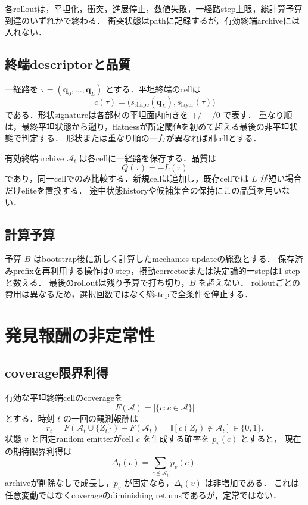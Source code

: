 \documentclass[a4paper,11pt]{ltjsarticle}
\newcommand{\ind}{\mathbb{I}}
\newcommand{\outarchive}{\mathcal A}
\begin{document}
各rolloutは，平坦化，衝突，進展停止，数値失敗，一経路step上限，総計算予算到達のいずれかで終わる．
衝突状態はpathに記録するが，有効終端archiveには入れない．

\subsection{終端descriptorと品質}

一経路を \(\tau=(\bm q_0,\ldots,\bm q_L)\) とする．平坦終端のcellは
\begin{equation}
  c(\tau)=
  \bigl(s_{\mathrm{shape}}(\bm q_L),
        s_{\mathrm{layer}}(\tau)\bigr)
  \label{eq:terminal-cell}
\end{equation}
である．形状signatureは各部材の平坦面内向きを \(+/-/0\) で表す．
重なり順は，最終平坦状態から遡り，flatnessが所定閾値を初めて超える最後の非平坦状態で判定する．
形状または重なり順の一方が異なれば別cellとする．

有効終端archive \(\outarchive_t\) は各cellに一経路を保存する．品質は
\begin{equation}
  Q(\tau)=-L(\tau)
\end{equation}
であり，同一cellでのみ比較する．新規cellは追加し，既存cellでは \(L\) が短い場合だけeliteを置換する．
途中状態historyや候補集合の保持にこの品質を用いない．

\subsection{計算予算}

予算 \(B\) はbootstrap後に新しく計算したmechanics updateの総数とする．
保存済みprefixを再利用する操作は0 step，摂動correctorまたは決定論的一stepは1 stepと数える．
最後のrolloutは残り予算で打ち切り，\(B\) を超えない．
rolloutごとの費用は異なるため，選択回数ではなく総stepで全条件を停止する．

\section{発見報酬の非定常性}
\label{sec:nonstationarity}

\subsection{coverage限界利得}

有効な平坦終端cellのcoverageを
\begin{equation}
  F(\outarchive)=|\{c:c\in\outarchive\}|
\end{equation}
とする．時刻 \(t\) の一回の観測報酬は
\begin{equation}
  r_t=
  F(\outarchive_t\cup\{Z_t\})-F(\outarchive_t)
  =\ind[c(Z_t)\notin\outarchive_t]
  \in\{0,1\}.
  \label{eq:binary-reward}
\end{equation}
状態 \(v\) と固定random emitterがcell \(c\) を生成する確率を \(p_v(c)\) とすると，
現在の期待限界利得は
\begin{equation}
  \Delta_t(v)
  =\sum_{c\notin\outarchive_t}p_v(c).
  \label{eq:missing-mass}
\end{equation}
archiveが削除なしで成長し，\(p_v\) が固定なら，\(\Delta_t(v)\) は非増加である．
これは任意変動ではなくcoverageのdiminishing returnsであるが，定常ではない．
\end{document}
